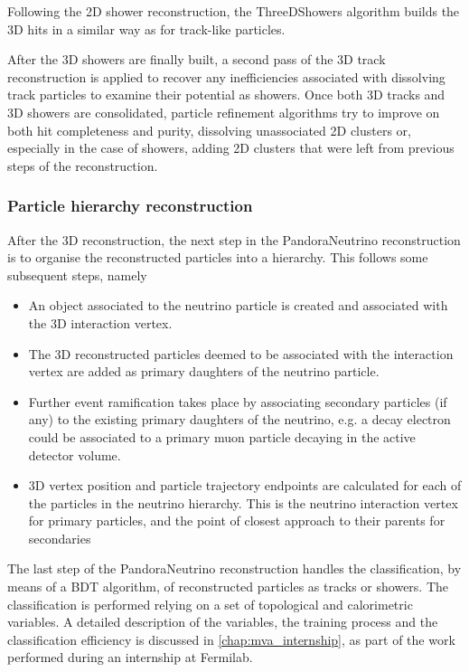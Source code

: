 Following the 2D shower reconstruction, the ThreeDShowers algorithm builds the 3D hits in a similar way as for track-like particles. 

After the 3D showers are finally built, a second pass of the 3D track reconstruction is applied to recover any inefficiencies associated with dissolving track particles to examine their potential as showers. Once both 3D tracks and 3D showers are consolidated, particle refinement algorithms try to improve on both hit completeness and purity, dissolving unassociated 2D clusters or, especially in the case of showers, adding 2D clusters that were left from previous steps of the reconstruction. 

\subsubsection{Particle hierarchy reconstruction}

After the 3D reconstruction, the next step in the PandoraNeutrino reconstruction is to organise the reconstructed particles into a hierarchy. This follows some subsequent steps, namely \begin{itemize}
    \item An object associated to the neutrino particle is created and associated with the 3D interaction vertex.
    \item The 3D reconstructed particles deemed to be associated with the interaction vertex are added as primary daughters of the neutrino particle.
    \item Further event ramification takes place by associating secondary particles (if any) to the existing primary daughters of the neutrino, e.g. a decay electron could be associated to a primary muon particle decaying in the active detector volume.
    \item 3D vertex position and particle trajectory endpoints are calculated for each of the particles in the neutrino hierarchy. This is the neutrino interaction vertex for primary particles, and the point of closest approach to their parents for secondaries
\end{itemize}

The last step of the PandoraNeutrino reconstruction handles the classification, by means of a BDT algorithm, of reconstructed particles as tracks or showers. The classification is performed relying on a set of topological and calorimetric variables. A detailed description of the variables, the training process and the classification efficiency is discussed in \autoref{chap:mva_internship}, as part of the work performed during an internship at Fermilab. 

